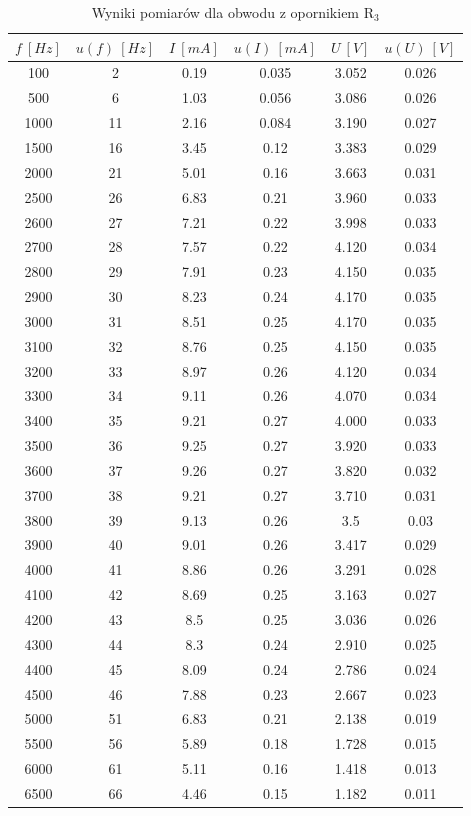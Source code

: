 \documentclass[12pt, a4paper, oneside]{article}
\begin{document}
\begin{table}[h]
  \centering
  \caption{Wyniki pomiarów dla obwodu z opornikiem R$_3$}
    \begin{tabular}{|c|c|c|c|c|c|}\hline
    $f~[Hz]$ & $u(f)~[Hz]$ & $I~[mA]$ & $u(I)~[mA]$ & $U~[V]$ & $u(U)~[V]$ \\\hline
    100 & 2 & 0.19 & 0.035 & 3.052 & 0.026 \\\hline
    500 & 6 & 1.03 & 0.056 & 3.086 & 0.026 \\\hline
    1000 & 11 & 2.16 & 0.084 & 3.190 & 0.027 \\\hline
    1500 & 16 & 3.45 & 0.12 & 3.383 & 0.029 \\\hline
    2000 & 21 & 5.01 & 0.16 & 3.663 & 0.031 \\\hline
    2500 & 26 & 6.83 & 0.21 & 3.960 & 0.033 \\\hline
    2600 & 27 & 7.21 & 0.22 & 3.998 & 0.033 \\\hline
    2700 & 28 & 7.57 & 0.22 & 4.120 & 0.034 \\\hline
    2800 & 29 & 7.91 & 0.23 & 4.150 & 0.035 \\\hline
    2900 & 30 & 8.23 & 0.24 & 4.170 & 0.035 \\\hline
    3000 & 31 & 8.51 & 0.25 & 4.170 & 0.035 \\\hline
    3100 & 32 & 8.76 & 0.25 & 4.150 & 0.035 \\\hline
    3200 & 33 & 8.97 & 0.26 & 4.120 & 0.034 \\\hline
    3300 & 34 & 9.11 & 0.26 & 4.070 & 0.034 \\\hline
    3400 & 35 & 9.21 & 0.27 & 4.000 & 0.033 \\\hline
    3500 & 36 & 9.25 & 0.27 & 3.920 & 0.033 \\\hline
    3600 & 37 & 9.26 & 0.27 & 3.820 & 0.032 \\\hline
    3700 & 38 & 9.21 & 0.27 & 3.710 & 0.031 \\\hline
    3800 & 39 & 9.13 & 0.26 & 3.5 & 0.03 \\\hline
    3900 & 40 & 9.01 & 0.26 & 3.417 & 0.029 \\\hline
    4000 & 41 & 8.86 & 0.26 & 3.291 & 0.028 \\\hline
    4100 & 42 & 8.69 & 0.25 & 3.163 & 0.027 \\\hline
    4200 & 43 & 8.5 & 0.25 & 3.036 & 0.026 \\\hline
    4300 & 44 & 8.3 & 0.24 & 2.910 & 0.025 \\\hline
    4400 & 45 & 8.09 & 0.24 & 2.786 & 0.024 \\\hline
    4500 & 46 & 7.88 & 0.23 & 2.667 & 0.023 \\\hline
    5000 & 51 & 6.83 & 0.21 & 2.138 & 0.019 \\\hline
    5500 & 56 & 5.89 & 0.18 & 1.728 & 0.015 \\\hline
    6000 & 61 & 5.11 & 0.16 & 1.418 & 0.013 \\\hline
    6500 & 66 & 4.46 & 0.15 & 1.182 & 0.011 \\\hline
    \end{tabular}%
  \label{tab:addlabel}%
\end{table}%
\end{document}
